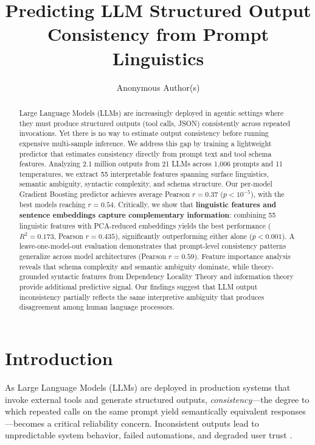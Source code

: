 \documentclass{article}
\title{Predicting LLM Structured Output Consistency from Prompt Linguistics}
\author{
  Anonymous Author(s)
}
\begin{document}
\maketitle

\begin{abstract}
Large Language Models (LLMs) are increasingly deployed in agentic settings where they must produce structured outputs (tool calls, JSON) consistently across repeated invocations. Yet there is no way to estimate output consistency before running expensive multi-sample inference. We address this gap by training a lightweight predictor that estimates consistency directly from prompt text and tool schema features. Analyzing 2.1 million outputs from 21 LLMs across 1,006 prompts and 11 temperatures, we extract 55 interpretable features spanning surface linguistics, semantic ambiguity, syntactic complexity, and schema structure. Our per-model Gradient Boosting predictor achieves average Pearson $r = 0.37$ ($p < 10^{-5}$), with the best models reaching $r = 0.54$. Critically, we show that \textbf{linguistic features and sentence embeddings capture complementary information}: combining 55 linguistic features with PCA-reduced embeddings yields the best performance ($R^2 = 0.173$, Pearson $r = 0.435$), significantly outperforming either alone ($p < 0.001$). A leave-one-model-out evaluation demonstrates that prompt-level consistency patterns generalize across model architectures (Pearson $r = 0.59$). Feature importance analysis reveals that schema complexity and semantic ambiguity dominate, while theory-grounded syntactic features from Dependency Locality Theory and information theory provide additional predictive signal. Our findings suggest that LLM output inconsistency partially reflects the same interpretive ambiguity that produces disagreement among human language processors.
\end{abstract}


\section{Introduction}
\label{sec:intro}

As Large Language Models (LLMs) are deployed in production systems that invoke external tools and generate structured outputs, \emph{consistency}---the degree to which repeated calls on the same prompt yield semantically equivalent responses---becomes a critical reliability concern. Inconsistent outputs lead to unpredictable system behavior, failed automations, and degraded user trust \citep{ouyang2022training, schick2023toolformer}.
\end{document}
